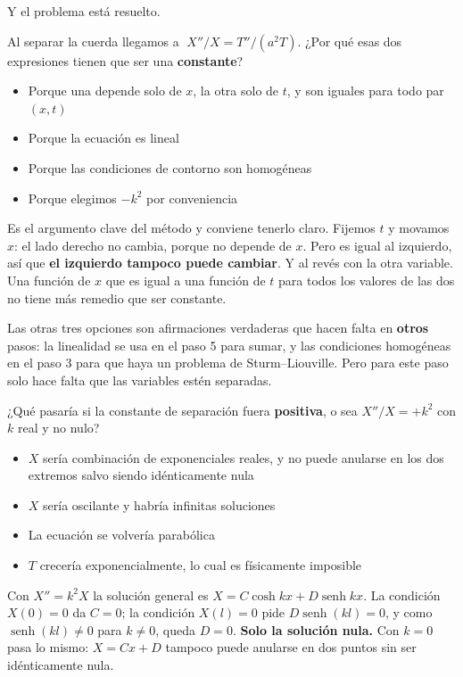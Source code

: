 \documentclass[
  spanish,
  a4paper,
]{scrbook}
\providecommand{\tightlist}{%
  \setlength{\itemsep}{0pt}\setlength{\parskip}{0pt}}
\theoremstyle{definition}
\theoremstyle{plain}
\theoremstyle{definition}
\theoremstyle{plain}
\theoremstyle{definition}
\theoremstyle{remark}
\begin{document}
Y el problema está resuelto.

Al separar la cuerda llegamos a \(\;X''/X = T''/(a^2T)\). ¿Por qué esas
dos expresiones tienen que ser una \textbf{constante}?

\begin{itemize}
\tightlist
\item
  {Porque una depende solo de \(x\), la otra solo de \(t\), y son
  iguales para todo par \((x,t)\)}
\item
  {Porque la ecuación es lineal}
\item
  {Porque las condiciones de contorno son homogéneas}
\item
  {Porque elegimos \(-k^2\) por conveniencia}
\end{itemize}

Es el argumento clave del método y conviene tenerlo claro. Fijemos \(t\)
y movamos \(x\): el lado derecho no cambia, porque no depende de \(x\).
Pero es igual al izquierdo, así que \textbf{el izquierdo tampoco puede
cambiar}. Y al revés con la otra variable. Una función de \(x\) que es
igual a una función de \(t\) para todos los valores de las dos no tiene
más remedio que ser constante.

Las otras tres opciones son afirmaciones verdaderas que hacen falta en
\textbf{otros} pasos: la linealidad se usa en el paso 5 para sumar, y
las condiciones homogéneas en el paso 3 para que haya un problema de
Sturm--Liouville. Pero para este paso solo hace falta que las variables
estén separadas.

¿Qué pasaría si la constante de separación fuera \textbf{positiva}, o
sea \(X''/X = +k^2\) con \(k\) real y no nulo?

\begin{itemize}
\tightlist
\item
  {\(X\) sería combinación de exponenciales reales, y no puede anularse
  en los dos extremos salvo siendo idénticamente nula}
\item
  {\(X\) sería oscilante y habría infinitas soluciones}
\item
  {La ecuación se volvería parabólica}
\item
  {\(T\) crecería exponencialmente, lo cual es físicamente imposible}
\end{itemize}

Con \(X'' = k^2X\) la solución general es
\(X = C\cosh kx + D\operatorname{senh} kx\). La condición \(X(0)=0\) da
\(C=0\); la condición \(X(l)=0\) pide \(D\operatorname{senh}(kl)=0\), y
como \(\operatorname{senh}(kl)\neq 0\) para \(k\neq 0\), queda \(D=0\).
\textbf{Solo la solución nula.} Con \(k=0\) pasa lo mismo: \(X = Cx+D\)
tampoco puede anularse en dos puntos sin ser idénticamente nula.
\end{document}

